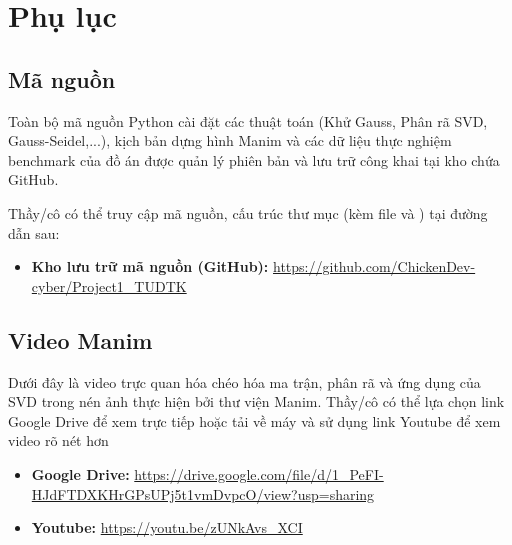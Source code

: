 \documentclass[a4paper]{article}
\begin{document}
\newpage
\section{Phụ lục}
\subsection{Mã nguồn}
Toàn bộ mã nguồn Python cài đặt các thuật toán (Khử Gauss, Phân rã SVD, Gauss-Seidel,...), kịch bản dựng hình Manim và các dữ liệu thực nghiệm benchmark của đồ án được quản lý phiên bản và lưu trữ công khai tại kho chứa GitHub. 

Thầy/cô có thể truy cập mã nguồn, cấu trúc thư mục (kèm file  và ) tại đường dẫn sau:

\begin{itemize}
    \item \textbf{Kho lưu trữ mã nguồn (GitHub):} \url{https://github.com/ChickenDev-cyber/Project1_TUDTK}
\end{itemize}

\subsection{Video Manim}
Dưới đây là video trực quan hóa chéo hóa ma trận, phân rã và ứng dụng của SVD trong nén ảnh thực hiện bởi thư viện Manim. Thầy/cô có thể lựa chọn link Google Drive để xem trực tiếp hoặc tải về máy và sử dụng link Youtube để xem video rõ nét hơn
\begin{itemize}
    \item \textbf{Google Drive:} \url{https://drive.google.com/file/d/1_PeFI-HJdFTDXKHrGPsUPj5t1vmDvpcO/view?usp=sharing}
    \item \textbf{Youtube:} \url{https://youtu.be/zUNkAvs_XCI}
\end{itemize}

\label{page:lastpage}
\end{document}
